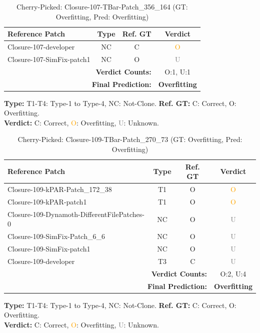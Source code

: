 \begin{table}[t]
\centering
\caption{Cherry-Picked: Closure-107-TBar-Patch\_356\_164 (GT: Overfitting, Pred: Overfitting)}
\label{tab:cherry-Closure107TBarPatch356164}
\footnotesize
\renewcommand{\arraystretch}{1.1}
\setlength{\tabcolsep}{4pt}
\begin{tabular}{l|c|c|c}
\hline
\textbf{Reference Patch} & \textbf{Type} & \textbf{Ref. GT} & \textbf{Verdict} \\
\hline
Closure-107-developer & NC & C & \textcolor{orange}{O} \\
Closure-107-SimFix-patch1 & NC & O & \textcolor{gray}{U} \\
\hline
\multicolumn{3}{r|}{\textbf{Verdict Counts:}} & O:1, U:1 \\
\multicolumn{3}{r|}{\textbf{Final Prediction:}} & \textbf{Overfitting} \\
\hline
\end{tabular}
\vspace{1mm}
\parbox{\linewidth}{\centering\footnotesize 
\vspace{1mm}
\textbf{Type:} T1-T4: Type-1 to Type-4, NC: Not-Clone. \;
\textbf{Ref. GT:} C: Correct, O: Overfitting. \\
\textbf{Verdict:} \textcolor{green!60!black}{C}: Correct, \textcolor{orange}{O}: Overfitting, \textcolor{gray}{U}: Unknown.}
\end{table}


\begin{table}[t]
\centering
\caption{Cherry-Picked: Closure-109-TBar-Patch\_270\_73 (GT: Overfitting, Pred: Overfitting)}
\label{tab:cherry-Closure109TBarPatch27073}
\footnotesize
\renewcommand{\arraystretch}{1.1}
\setlength{\tabcolsep}{4pt}
\begin{tabular}{l|c|c|c}
\hline
\textbf{Reference Patch} & \textbf{Type} & \textbf{Ref. GT} & \textbf{Verdict} \\
\hline
Closure-109-kPAR-Patch\_172\_38 & T1 & O & \textcolor{orange}{O} \\
Closure-109-kPAR-patch1 & T1 & O & \textcolor{orange}{O} \\
Closure-109-Dynamoth-DifferentFilePatches-0 & NC & O & \textcolor{gray}{U} \\
Closure-109-SimFix-Patch\_6\_6 & NC & O & \textcolor{gray}{U} \\
Closure-109-SimFix-patch1 & NC & O & \textcolor{gray}{U} \\
Closure-109-developer & T3 & C & \textcolor{gray}{U} \\
\hline
\multicolumn{3}{r|}{\textbf{Verdict Counts:}} & O:2, U:4 \\
\multicolumn{3}{r|}{\textbf{Final Prediction:}} & \textbf{Overfitting} \\
\hline
\end{tabular}
\vspace{1mm}
\parbox{\linewidth}{\centering\footnotesize 
\vspace{1mm}
\textbf{Type:} T1-T4: Type-1 to Type-4, NC: Not-Clone. \;
\textbf{Ref. GT:} C: Correct, O: Overfitting. \\
\textbf{Verdict:} \textcolor{green!60!black}{C}: Correct, \textcolor{orange}{O}: Overfitting, \textcolor{gray}{U}: Unknown.}
\end{table}


